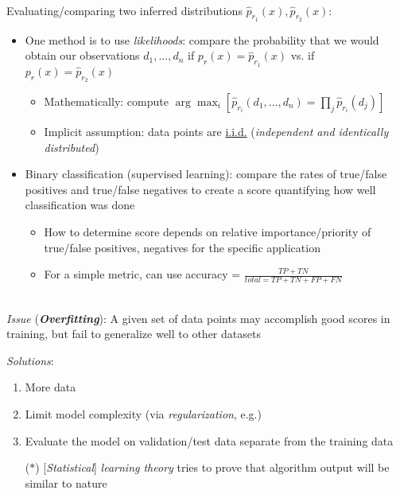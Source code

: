 \documentclass[12pt]{extarticle}
\theoremstyle{definition}
\theoremstyle{remark}
\newcommand{\pstart}[0]{\noindent}
\newcommand{\newp}[0]{~\\ \pstart}
\newcommand{\term}[1]{\noindent\textbf{\textit{#1}}}
\begin{document}
~\\ \pstart
Evaluating/comparing two inferred distributions $\hat{p}_{r_1}(x),\hat{p}_{r_2}(x)$: \begin{itemize}
    \item One method is to use \textit{likelihoods}: compare the probability that we would obtain our observations $d_1,\hdots,d_n$ if $p_r(x)=\hat{p}_{r_1}(x)$ vs. if $p_r(x)=\hat{p}_{r_2}(x)$
    \begin{itemize}
        \item Mathematically: compute $\arg\max_i\left[\hat{p}_{r_i}(d_1,\hdots,d_n)=\prod_j\hat{p}_{r_i}(d_j)\right]$ 
        \item Implicit assumption: data points are \ul{i.i.d.} (\textit{independent and identically distributed})
    \end{itemize}
    \item Binary classification (supervised learning): compare the rates of true/false positives and true/false negatives to create a score quantifying how well classification was done \begin{itemize}
        \item How to determine score depends on relative importance/priority of true/false positives, negatives for the specific application
        \item For a simple metric, can use accuracy = $\frac{TP+TN}{total=TP+TN+FP+FN}$
    \end{itemize}
\end{itemize}

\newp
\textit{Issue} (\term{Overfitting}): A given set of data points may accomplish good scores in training, but fail to generalize well to other datasets

\vspace{4pt}\pstart
\textit{Solutions}: \begin{enumerate}
    \item More data
    \item Limit model complexity (via \textit{regularization}, e.g.)
    \item Evaluate the model on validation/test data separate from the training data
    \item[($\ast$)] [\textit{Statistical}] \textit{learning theory} tries to prove that algorithm output will be similar to nature
\end{enumerate}
\end{document}
